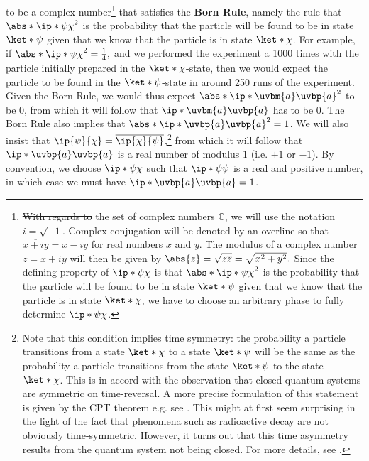 \documentclass[12pt]{report}
\providecommand{\DIFadd}[1]{{\protect\color{blue}\uwave{#1}}} %
\providecommand{\DIFdel}[1]{{\protect\color{red}\sout{#1}}}                      %
\providecommand{\DIFaddbegin}{} %
\providecommand{\DIFaddend}{} %
\providecommand{\DIFdelbegin}{} %
\providecommand{\DIFdelend}{} %
\begin{document}
to be a complex number\footnote{\DIFdelbegin \DIFdel{With regards to }\DIFdelend \DIFaddbegin \DIFadd{Regarding }\DIFaddend the set of complex numbers $\mathbb{C}$, %
%
we will use the notation $i=\sqrt{-1}$. %
%
Complex conjugation will be denoted by an overline so that $\overline{x+iy}=x-iy$ %
% 
for real numbers $x$ and $y$. The modulus of a complex number $z=x+iy$ will then be given by $\abs{z}=\sqrt{z\overline{z}}=\sqrt{x^2+y^2}.$ %
%
Since the defining property of  $\ip*{\psi}{\chi}$ is that $\abs*{\ip*{\psi}{\chi}}^2$ is the probability that the particle will be found to be in state $\ket*{\psi}$ given that we know that the particle is in state $\ket*{\chi}$, we have to choose an arbitrary phase to fully determine $\ip*{\psi}{\chi}$. } that satisfies the \textbf{Born Rule},\label{bornrule} namely the rule that $\abs*{\ip*{\psi}{\chi}}^2$ is the probability that the particle will be found to be in state $\ket*{\psi}$ given that we know that the particle is in state $\ket*{\chi}$. For example, if $\abs*{\ip*{\psi}{\chi}}^2=\frac{1}{4},$ and we performed the experiment a \DIFdelbegin \DIFdel{1000 }\DIFdelend \DIFaddbegin \DIFadd{thousand }\DIFaddend times with the particle initially prepared in the $\ket*{\chi}$-state, then we would expect the particle to be found in the $\ket*{\psi}$-state in around 250 runs of the experiment. Given the Born Rule, we  would thus expect $\abs*{\ip*{\uvbm{a}}{\uvbp{a}}}^2$ to be $0$, from which it will follow that $\ip*{\uvbm{a}}{\uvbp{a}}$ has to be $0$. The Born Rule also implies that $\abs*{\ip*{\uvbp{a}}{\uvbp{a}}}^2=1$. We will also insist that $\ip{\psi}{\chi}=\overline{\ip{\chi}{\psi}}$,\footnote{Note that this condition implies time symmetry: the probability a particle transitions from a state $\ket*{\chi}$ to a state $\ket*{\psi}$ will be the same as the probability a particle transitions from the state $\ket*{\psi}$ to the state $\ket*{\chi}$. This is in accord with the observation that closed quantum systems are symmetric on time-reversal. A more precise formulation of this statement is given by the CPT theorem e.g. see \cite[244]{WeinbergSteven1995Tqto}. This might at first seem surprising in the light of the fact that phenomena such as radioactive decay are not obviously time-symmetric. However, it turns out that this time asymmetry results from the quantum system not being closed. For more details, see \cite{Pascazio2013}.}  from which it will follow that $\ip*{\uvbp{a}}{\uvbp{a}}$ is a real number of modulus $1$ (i.e. $+1$ or $-1$). By convention, we choose $\ip*{\psi}{\chi}$  such that $\ip*{\psi}{\psi}$ is a real and positive number, in which case we must have $\ip*{\uvbp{a}}{\uvbp{a}}=1$.
\end{document}
